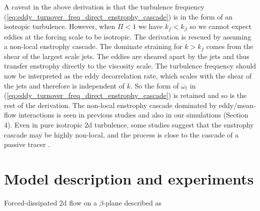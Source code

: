 \documentclass{ametsoc}
\begin{document}
A caveat in the above derivation is that the turbulence frequency (\ref{eq:eddy_turnover_freq_direct_enstrophy_cascade})
is in the form of an isotropic turbulence. However, when $\Pi<1$
we have $k_{f}<k_{\beta}$ so we cannot expect eddies at the forcing
scale to be isotropic. The derivation is rescued by assuming a non-local
enstrophy cascade. The dominate straining for $k>k_{f}$ comes from
the shear of the largest scale jets. The eddies are sheared apart
by the jets and thus transfer enstrophy directly to the viscosity
scale. The turbulence frequency should now be interpreted as the eddy
decorrelation rate, which scales with the shear of the jets and therefore
is independent of $k$. So the form of $\omega_{t}$ in (\ref{eq:eddy_turnover_freq_direct_enstrophy_cascade})
is retained and so is the rest of the derivation. The non-local enstrophy
cascade dominated by eddy/mean-flow interactions is seen in previous
studies \citep{Manz2009} and also in our simulations (Section 4).
Even in pure isotropic 2d turbulence, some studies suggest that the enstrophy
cascade may be highly non-local, and the process is close to the cascade
of a passive tracer \citep{Borue1993,Falkovich1994}.


\section{Model description and experiments}

Forced-dissipated 2d flow on a $\beta$-plane described as
\end{document}
